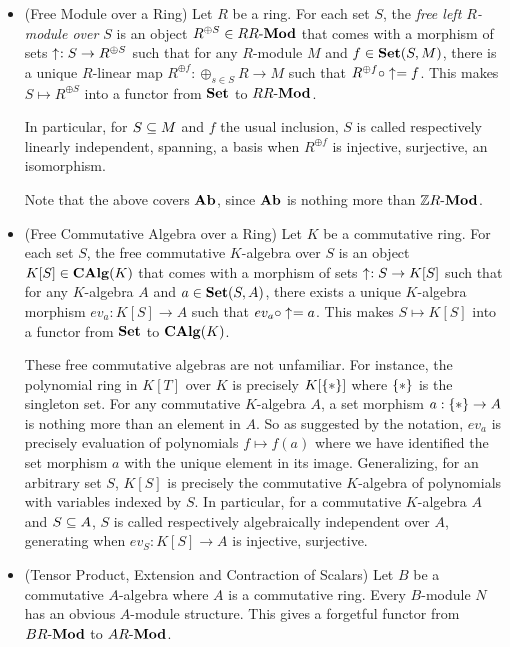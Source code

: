 \begin{eg}
\begin{itemize}
    \item (Free Module over a Ring)
    Let $R$ be a ring. 
    For each set $S$, 
    the \emph{free left $R$-module over $S$} is 
    an object $R^{\oplus S} \in RR\text{-}\mathbf{Mod}$ 
    that comes with a morphism of sets $\uparrow_{}^{} : S \to R^{\oplus S}$
    such that for any $R$-module $M$ and $f \in \mathbf{Set}(S,M)$,
    there is a unique $R$-linear map 
    $R^{\oplus f} : \oplus_{s \in S} R \to M$ such that 
    $R^{\oplus f} \circ \uparrow_{}^{} = f$. 
    This makes $S \mapsto R^{\oplus S}$ into a functor 
    from $\mathbf{Set}$ to $RR\text{-}\mathbf{Mod}$.

    In particular, for $S \subseteq M$ and $f$ the usual inclusion, 
    $S$ is called respectively linearly independent, spanning, a basis
    when $R^{\oplus f}$ is injective, surjective, an isomorphism.

    Note that the above covers $\mathbf{Ab}$, since 
    $\mathbf{Ab}$ is nothing more than $\mathbb{Z}R\text{-}\mathbf{Mod}$.

    \item (Free Commutative Algebra over a Ring)
    Let $K$ be a commutative ring. 
    For each set $S$, 
    the free commutative $K$-algebra over $S$ is an object $K[S] \in \mathbf{CAlg}(K)$
    that comes with a morphism of sets $\uparrow_{}^{} : S \to K[S]$ such that
    for any $K$-algebra $A$ and $a \in \mathbf{Set}(S,A)$,
    there exists a unique $K$-algebra morphism $ev_a : K[S] \to A$
    such that $ev_a \circ \uparrow_{}^{} = a$.
    This makes $S \mapsto K[S]$ into a functor 
    from $\mathbf{Set}$ to $\mathbf{CAlg}(K)$.

    These free commutative algebras are not unfamiliar.
    For instance, 
    the polynomial ring in $K[T]$ over $K$ is
    precisely $K[\left\{*\right\}]$ where $\left\{*\right\}$ is the singleton set.
    For any commutative $K$-algebra $A$,
    a set morphism $a : \left\{*\right\} \to A$ is nothing more than
    an element in $A$.
    So as suggested by the notation, $ev_a$ is precisely evaluation 
    of polynomials $f \mapsto f(a)$ where we have identified 
    the set morphism $a$ with the unique element in its image. 
    Generalizing, for an arbitrary set $S$,
    $K[S]$ is precisely the commutative $K$-algebra of polynomials 
    with variables indexed by $S$. 
    In particular, for a commutative $K$-algebra $A$ and $S \subseteq A$,
    $S$ is called respectively algebraically independent over $A$, generating
    when $ev_S : K[S] \to A$ is injective, surjective. 

    \item (Tensor Product, Extension and Contraction of Scalars)
    Let $B$ be a commutative $A$-algebra where $A$ is a commutative ring. 
    Every $B$-module $N$ has an obvious $A$-module structure. 
    This gives a forgetful functor from $BR\text{-}\mathbf{Mod}$ to $AR\text{-}\mathbf{Mod}$.
  

\end{itemize}
\end{eg}
